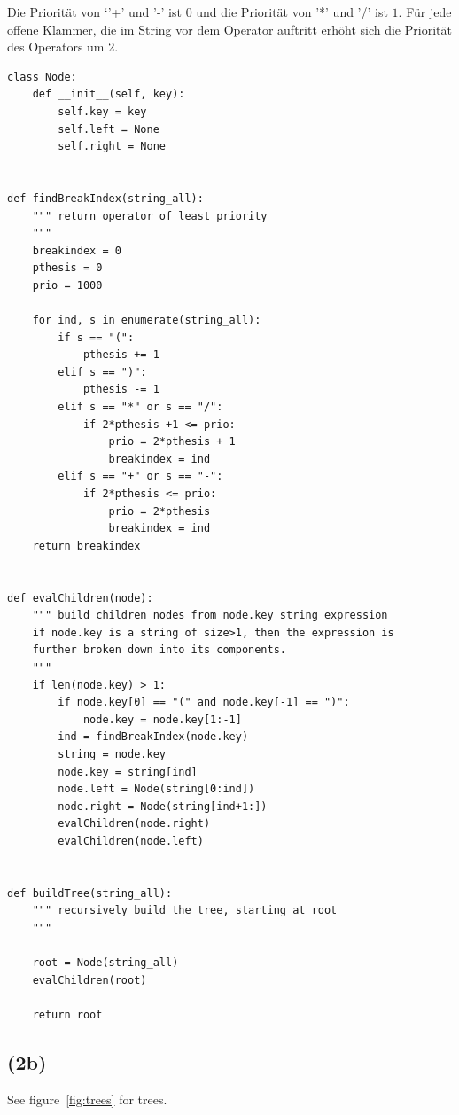 \documentclass[a4paper]{article}
\begin{document}
Die Priorität von `'+' und '-' ist $0$ und die Priorität von '*' und '/' ist $1$. Für jede offene Klammer, die im String vor dem Operator auftritt erhöht sich die Priorität des Operators um 2. 

\begin{verbatim}
class Node:
    def __init__(self, key):
        self.key = key
        self.left = None
        self.right = None
        

def findBreakIndex(string_all):
    """ return operator of least priority
    """
    breakindex = 0
    pthesis = 0
    prio = 1000

    for ind, s in enumerate(string_all):
        if s == "(":
            pthesis += 1
        elif s == ")":
            pthesis -= 1
        elif s == "*" or s == "/":
            if 2*pthesis +1 <= prio:
                prio = 2*pthesis + 1
                breakindex = ind
        elif s == "+" or s == "-":
            if 2*pthesis <= prio:
                prio = 2*pthesis
                breakindex = ind
    return breakindex


def evalChildren(node):
    """ build children nodes from node.key string expression
    if node.key is a string of size>1, then the expression is 
    further broken down into its components.
    """
    if len(node.key) > 1:
        if node.key[0] == "(" and node.key[-1] == ")":
            node.key = node.key[1:-1]
        ind = findBreakIndex(node.key)
        string = node.key
        node.key = string[ind]
        node.left = Node(string[0:ind])
        node.right = Node(string[ind+1:])
        evalChildren(node.right)
        evalChildren(node.left)
        

def buildTree(string_all):
    """ recursively build the tree, starting at root
    """

    root = Node(string_all)
    evalChildren(root)
    
    return root

\end{verbatim}


\subsection*{(2b)}

See figure~\ref{fig:trees} for trees.
\end{document}
